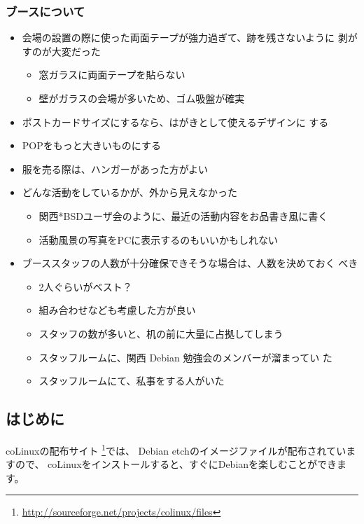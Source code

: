 \documentclass[mingoth,a4paper]{jsarticle}
\begin{document}
\subsubsection{ブースについて}

\begin{itemize}
 \item 会場の設置の際に使った両面テープが強力過ぎて、跡を残さないように
       剥がすのが大変だった
       \begin{itemize}
	\item 窓ガラスに両面テープを貼らない
	\item 壁がガラスの会場が多いため、ゴム吸盤が確実
       \end{itemize}
 \item ポストカードサイズにするなら、はがきとして使えるデザインに
       する
 \item POPをもっと大きいものにする
 \item 服を売る際は、ハンガーがあった方がよい
 \item どんな活動をしているかが、外から見えなかった
       \begin{itemize}
	\item 関西*BSDユーザ会のように、最近の活動内容をお品書き風に書く
	\item 活動風景の写真をPCに表示するのもいいかもしれない
       \end{itemize}
 \item ブーススタッフの人数が十分確保できそうな場合は、人数を決めておく
       べき
       \begin{itemize}
	\item 2人ぐらいがベスト？
	\item 組み合わせなども考慮した方が良い
	\item スタッフの数が多いと、机の前に大量に占拠してしまう
	\item スタッフルームに、関西 Debian 勉強会のメンバーが溜まってい
	      た
	\item スタッフルームにて、私事をする人がいた
       \end{itemize}
\end{itemize}

\label{sec:colinux}

\subsection{はじめに}
coLinuxの配布サイト
\footnote{\url{http://sourceforge.net/projects/colinux/files}}では、
Debian etchのイメージファイルが配布されていますので、
coLinuxをインストールすると、すぐにDebianを楽しむことができます。
\end{document}
